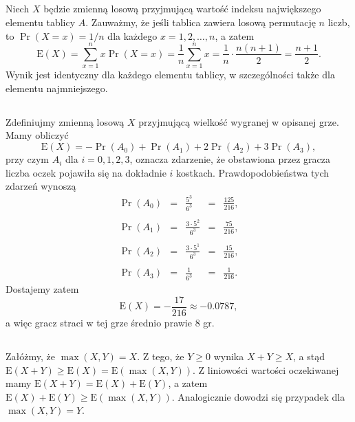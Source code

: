 \subsection{} %
Niech $X$ będzie zmienną losową przyjmującą wartość indeksu największego elementu tablicy $A$. Zauważmy, że jeśli tablica zawiera losową permutację $n$ liczb, to $\Pr(X=x)=1/n$ dla każdego $x=1,2,\dots,n$, a zatem
\[
	\mathrm{E}(X) = \sum_{x=1}^nx\Pr(X=x) = \frac{1}{n}\sum_{x=1}^nx = \frac{1}{n}\cdot\frac{n(n+1)}{2} = \frac{n+1}{2}.
\]
Wynik jest identyczny dla każdego elementu tablicy, w szczególności także dla elementu najmniejszego.

\subsection{} %
Zdefiniujmy zmienną losową $X$ przyjmującą wielkość wygranej w opisanej grze. Mamy obliczyć
\[
	\mathrm{E}(X) = -\Pr(A_0)+\Pr(A_1)+2\Pr(A_2)+3\Pr(A_3),
\]
przy czym $A_i$ dla $i=0,1,2,3$, oznacza zdarzenie, że obstawiona przez gracza liczba oczek pojawiła się na dokładnie $i$ kostkach. Prawdopodobieństwa tych zdarzeń wynoszą
\[
\begin{array}{rcccr}
	\Pr(A_0) &=& {\displaystyle\frac{5^3}{6^3}} &=& {\displaystyle\frac{125}{216}}, \\\\
	\Pr(A_1) &=& {\displaystyle\frac{3\cdot 5^2}{6^3}} &=& {\displaystyle\frac{75}{216}}, \\\\
	\Pr(A_2) &=& {\displaystyle\frac{3\cdot 5^1}{6^3}} &=& {\displaystyle\frac{15}{216}}, \\\\
	\Pr(A_3) &=& {\displaystyle\frac{1}{6^3}} &=& {\displaystyle\frac{1}{216}}.
\end{array}
\]
Dostajemy zatem
\[
	\mathrm{E}(X) = -\frac{17}{216}\approx -0.0787,
\]
a więc gracz straci w tej grze średnio prawie $8$ gr.

\subsection{} %
Załóżmy, że $\max (X,Y)=X$. Z tego, że $Y\ge 0$ wynika $X+Y\ge X$, a stąd $\mathrm{E}(X+Y)\ge\mathrm{E}(X)=\mathrm{E}(\max (X,Y))$. Z liniowości wartości oczekiwanej mamy $\mathrm{E}(X+Y)=\mathrm{E}(X)+\mathrm{E}(Y)$, a zatem $\mathrm{E}(X)+\mathrm{E}(Y)\ge\mathrm{E}(\max (X,Y))$. Analogicznie dowodzi się przypadek dla $\max (X,Y)=Y$.

